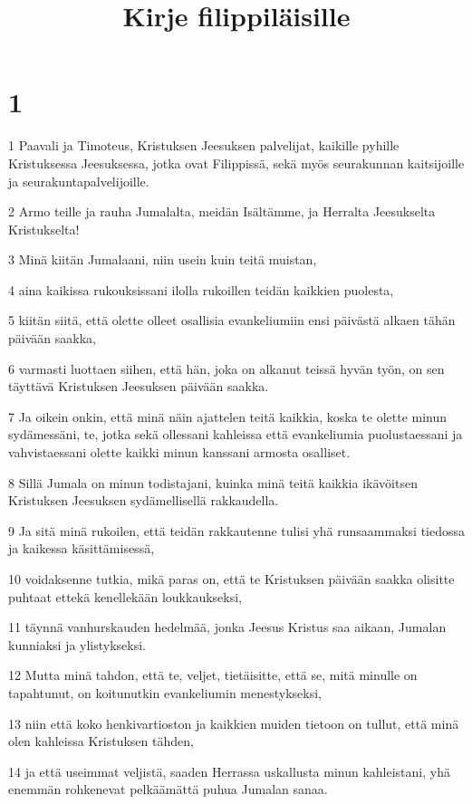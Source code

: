 

\title{Kirje filippiläisille}


\chapter{1}

\par 1 Paavali ja Timoteus, Kristuksen Jeesuksen palvelijat, kaikille pyhille Kristuksessa Jeesuksessa, jotka ovat Filippissä, sekä myös seurakunnan kaitsijoille ja seurakuntapalvelijoille.
\par 2 Armo teille ja rauha Jumalalta, meidän Isältämme, ja Herralta Jeesukselta Kristukselta!
\par 3 Minä kiitän Jumalaani, niin usein kuin teitä muistan,
\par 4 aina kaikissa rukouksissani ilolla rukoillen teidän kaikkien puolesta,
\par 5 kiitän siitä, että olette olleet osallisia evankeliumiin ensi päivästä alkaen tähän päivään saakka,
\par 6 varmasti luottaen siihen, että hän, joka on alkanut teissä hyvän työn, on sen täyttävä Kristuksen Jeesuksen päivään saakka.
\par 7 Ja oikein onkin, että minä näin ajattelen teitä kaikkia, koska te olette minun sydämessäni, te, jotka sekä ollessani kahleissa että evankeliumia puolustaessani ja vahvistaessani olette kaikki minun kanssani armosta osalliset.
\par 8 Sillä Jumala on minun todistajani, kuinka minä teitä kaikkia ikävöitsen Kristuksen Jeesuksen sydämellisellä rakkaudella.
\par 9 Ja sitä minä rukoilen, että teidän rakkautenne tulisi yhä runsaammaksi tiedossa ja kaikessa käsittämisessä,
\par 10 voidaksenne tutkia, mikä paras on, että te Kristuksen päivään saakka olisitte puhtaat ettekä kenellekään loukkaukseksi,
\par 11 täynnä vanhurskauden hedelmää, jonka Jeesus Kristus saa aikaan, Jumalan kunniaksi ja ylistykseksi.
\par 12 Mutta minä tahdon, että te, veljet, tietäisitte, että se, mitä minulle on tapahtunut, on koitunutkin evankeliumin menestykseksi,
\par 13 niin että koko henkivartioston ja kaikkien muiden tietoon on tullut, että minä olen kahleissa Kristuksen tähden,
\par 14 ja että useimmat veljistä, saaden Herrassa uskallusta minun kahleistani, yhä enemmän rohkenevat pelkäämättä puhua Jumalan sanaa.
